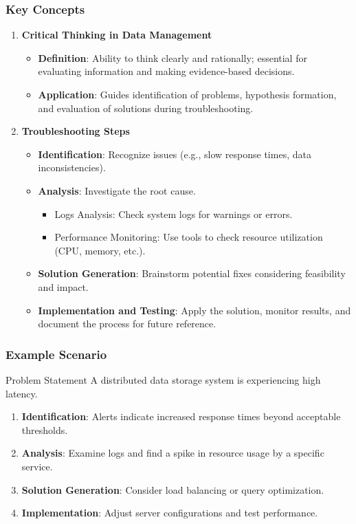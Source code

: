 \documentclass[aspectratio=169]{beamer}
\begin{document}
\begin{frame}[fragile]
  \frametitle{Key Concepts}
  \begin{enumerate}
    \item \textbf{Critical Thinking in Data Management}
      \begin{itemize}
        \item \textbf{Definition}: Ability to think clearly and rationally; essential for evaluating information and making evidence-based decisions.
        \item \textbf{Application}: Guides identification of problems, hypothesis formation, and evaluation of solutions during troubleshooting.
      \end{itemize}
      
    \item \textbf{Troubleshooting Steps}
      \begin{itemize}
        \item \textbf{Identification}: Recognize issues (e.g., slow response times, data inconsistencies).
        \item \textbf{Analysis}: Investigate the root cause.
          \begin{itemize}
            \item Logs Analysis: Check system logs for warnings or errors.
            \item Performance Monitoring: Use tools to check resource utilization (CPU, memory, etc.).
          \end{itemize}
        \item \textbf{Solution Generation}: Brainstorm potential fixes considering feasibility and impact.
        \item \textbf{Implementation and Testing}: Apply the solution, monitor results, and document the process for future reference.
      \end{itemize}
  \end{enumerate}
\end{frame}

\begin{frame}[fragile]
  \frametitle{Example Scenario}
  \begin{block}{Problem Statement}
    A distributed data storage system is experiencing high latency.
  \end{block}
  \begin{enumerate}
    \item \textbf{Identification}: Alerts indicate increased response times beyond acceptable thresholds.
    \item \textbf{Analysis}: Examine logs and find a spike in resource usage by a specific service.
    \item \textbf{Solution Generation}: Consider load balancing or query optimization.
    \item \textbf{Implementation}: Adjust server configurations and test performance.
  \end{enumerate}
\end{frame}
\end{document}
